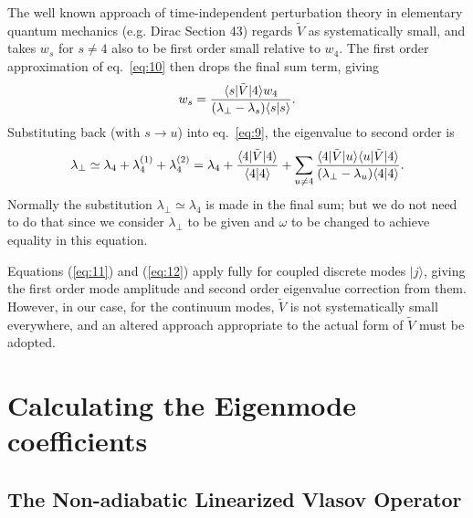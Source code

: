 \documentclass[12pt]{article}
\def\ket#1{|#1\rangle}
\def\bra#1{\langle#1}
\begin{document}
The well known approach of time-independent perturbation theory in
elementary quantum mechanics (e.g. Dirac Section 43) regards $\tilde{V}$ as
systematically small, and takes $w_s$ for $s\not=4$ also to be first
order small relative to $w_4$. The first order approximation of eq.\
\ref{eq:10} then drops the final sum term, giving
\begin{equation}
  \label{eq:11}
  w_s = {\bra{s}|\tilde{V}\ket{4}w_4\over (\lambda_\perp-\lambda_s)\bra{s}\ket{s}}.
\end{equation}
Substituting back (with $s\to u$) into eq.\ \ref{eq:9}, the
eigenvalue to second order is
\begin{equation}
  \label{eq:12}
 \lambda_\perp\simeq \lambda_4+\lambda_{4}^{(1)}+\lambda_{4}^{(2)}=\lambda_4
  +{\bra{4}|\tilde{V}\ket{4}\over \bra{4}\ket{4}}
    +\sum_{u\not=4}
    {\bra{4}|\tilde{V}\ket{u}\bra{u}|\tilde{V}\ket{4}\over
      (\lambda_\perp-\lambda_u)\bra{4}\ket{4}}.
\end{equation}
Normally the substitution $\lambda_\perp\simeq\lambda_4$ is made in
the final sum; but we do not need to do that since we consider
$\lambda_\perp$ to be given and $\omega$ to be changed to achieve
equality in this equation.

Equations (\ref{eq:11}) and (\ref{eq:12}) apply fully for coupled
discrete modes $\ket{j}$, giving the first order mode amplitude and
second order eigenvalue correction from them.  However, in our case,
for the continuum modes, $\tilde{V}$ is not systematically small
everywhere, and an altered approach appropriate to the actual form of
$\tilde{V}$ must be adopted.


\section{Calculating the Eigenmode coefficients}
\subsection{The Non-adiabatic Linearized Vlasov Operator}
\end{document}
